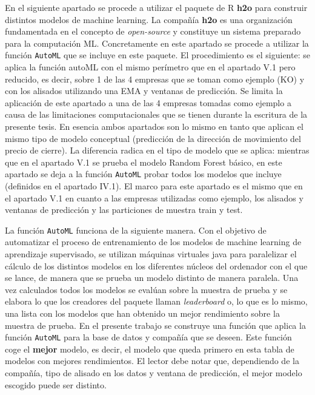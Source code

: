 \documentclass[]{DissertateUSU}
\begin{document}
\noindent En el siguiente apartado se procede a utilizar el paquete de R
\textbf{h2o} para construir distintos modelos de machine learning. La
compañía \textbf{h2o} es una organización fundamentada en el concepto de
\emph{open-source} y constituye un sistema preparado para la computación
ML. Concretamente en este apartado se procede a utilizar la función
\texttt{AutoML} que se incluye en este paquete. El procedimiento es el
siguiente: se aplica la función autoML con el mismo perímetro que en el
apartado V.1 pero reducido, es decir, sobre 1 de las 4 empresas que se
toman como ejemplo (KO) y con los alisados utilizando una EMA y ventanas
de predicción. Se limita la aplicación de este apartado a una de las 4
empresas tomadas como ejemplo a causa de las limitaciones
computacionales que se tienen durante la escritura de la presente tesis.
En esencia ambos apartados son lo mismo en tanto que aplican el mismo
tipo de modelo conceptual (predicción de la dirección de movimiento del
precio de cierre). La diferencia radica en el tipo de modelo que se
aplica: mientras que en el apartado V.1 se prueba el modelo Random
Forest básico, en este apartado se deja a la función \texttt{AutoML}
probar todos los modelos que incluye (definidos en el apartado IV.1). El
marco para este apartado es el mismo que en el apartado V.1 en cuanto a
las empresas utilizadas como ejemplo, los alisados y ventanas de
predicción y las particiones de muestra train y test.

\noindent La función \texttt{AutoML} funciona de la siguiente manera.
Con el objetivo de automatizar el proceso de entrenamiento de los
modelos de machine learning de aprendizaje supervisado, se utilizan
máquinas virtuales java para paralelizar el cálculo de los distintos
modelos en los diferentes núcleos del ordenador con el que se lance, de
manera que se prueba un modelo distinto de manera paralela. Una vez
calculados todos los modelos se evalúan sobre la muestra de prueba y se
elabora lo que los creadores del paquete llaman \emph{leaderboard} o, lo
que es lo mismo, una lista con los modelos que han obtenido un mejor
rendimiento sobre la muestra de prueba. En el presente trabajo se
construye una función que aplica la función \texttt{AutoML} para la base
de datos y compañía que se deseen. Este función coge el \textbf{mejor}
modelo, es decir, el modelo que queda primero en esta tabla de modelos
con mejores rendimientos. El lector debe notar que, dependiendo de la
compañía, tipo de alisado en los datos y ventana de predicción, el mejor
modelo escogido puede ser distinto.
\end{document}
